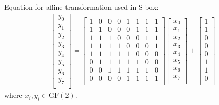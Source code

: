 \documentclass[11pt,oneside,final]{fithesis2}
\begin{document}
	Equation for affine transformation used in S-box:
	\begin{align}
		\begin{bmatrix}
		    y_0\\
		    y_1\\
		    y_2\\
		    y_3\\
		    y_4\\
		    y_5\\
		    y_6\\
		    y_7\\
		\end{bmatrix}
		    =
		\begin{bmatrix}
		    1 & 0 & 0 & 0 & 1 & 1 & 1 & 1 \\
		    1 & 1 & 0 & 0 & 0 & 1 & 1 & 1 \\
		    1 & 1 & 1 & 0 & 0 & 0 & 1 & 1 \\
		    1 & 1 & 1 & 1 & 0 & 0 & 0 & 1 \\
		    1 & 1 & 1 & 1 & 1 & 0 & 0 & 0 \\
		    0 & 1 & 1 & 1 & 1 & 1 & 0 & 0 \\
		    0 & 0 & 1 & 1 & 1 & 1 & 1 & 0 \\
		    0 & 0 & 0 & 0 & 1 & 1 & 1 & 1 \\
		\end{bmatrix}
		\begin{bmatrix}
		    x_0\\
		    x_1\\
		    x_2\\
		    x_3\\
		    x_4\\
		    x_5\\
		    x_6\\
		    x_7\\
		\end{bmatrix}
		    +
		\begin{bmatrix}
		    1\\
		    1\\
		    0\\
		    0\\
		    0\\
		    1\\
		    1\\
		    0\\
		\end{bmatrix}
	    \end{align}
	where $x_i, y_i \in \text{GF}(2)$.
\end{document}
